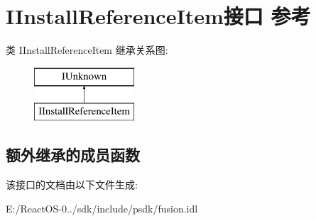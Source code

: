 \hypertarget{interface_i_install_reference_item}{}\section{I\+Install\+Reference\+Item接口 参考}
\label{interface_i_install_reference_item}
类 I\+Install\+Reference\+Item 继承关系图\+:\begin{figure}[H]
\begin{center}
\leavevmode
\includegraphics[height=2.000000cm]{interface_i_install_reference_item}
\end{center}
\end{figure}
\subsection*{额外继承的成员函数}


该接口的文档由以下文件生成\+:\begin{DoxyCompactItemize}
\item 
E\+:/\+React\+O\+S-\/0../sdk/include/psdk/fusion.\+idl\end{DoxyCompactItemize}
